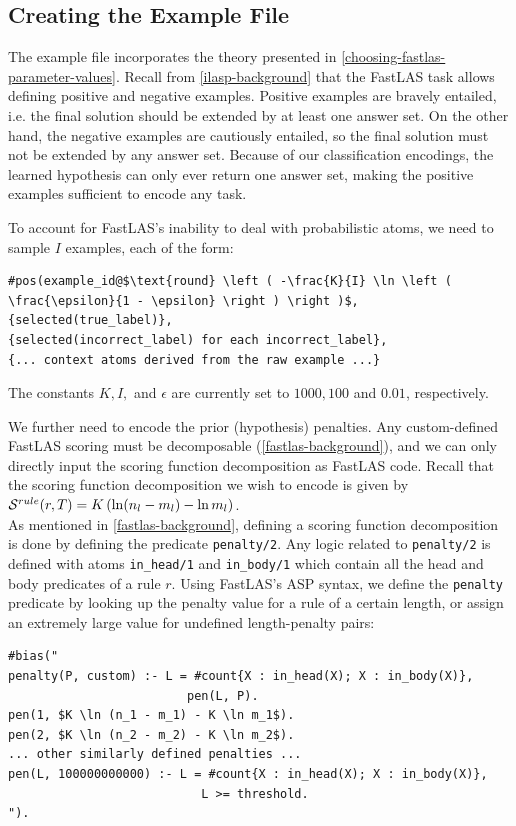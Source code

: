 \subsection{Creating the Example File}

The example file incorporates the theory presented in \ref{choosing-fastlas-parameter-values}.
Recall from \ref{ilasp-background} that the FastLAS task allows defining positive and negative examples.
Positive examples are bravely entailed, i.e. the final solution should be extended by at least one answer set.
On the other hand, the negative examples are cautiously entailed, so the final solution must not be extended by any answer set.
Because of our classification encodings, the learned hypothesis can only ever return one answer set, making the positive examples sufficient to encode any task.

To account for FastLAS's inability to deal with probabilistic atoms, we need to sample $I$ examples, each of the form:
\begin{lstlisting}
#pos(example_id@$\text{round} \left ( -\frac{K}{I} \ln \left ( \frac{\epsilon}{1 - \epsilon} \right ) \right )$,
{selected(true_label)},
{selected(incorrect_label) for each incorrect_label}, 
{... context atoms derived from the raw example ...}
\end{lstlisting}

The constants $K, I,$ and $\epsilon$ are currently set to $1000, 100$ and $0.01$, respectively.

We further need to encode the prior (hypothesis) penalties.
Any custom-defined FastLAS scoring must be decomposable (\ref{fastlas-background}), and we can only directly input the scoring function decomposition as FastLAS code.
Recall that the scoring function decomposition we wish to encode is given by $\mathcal{S}^{rule}(r, T) = K \left (\ln (n_l - m_l) - \ln m_l  \right)$.  \\
As mentioned in \ref{fastlas-background}, defining a scoring function decomposition is done by defining the predicate \verb_penalty/2_. Any logic related to \verb_penalty/2_ is defined with atoms \verb+in_head/1+ and \verb+in_body/1+ which contain all the head and body predicates of a rule $r$.
Using FastLAS's ASP syntax, we define the \verb_penalty_ predicate by looking up the penalty value for a rule of a certain length, or assign an extremely large value for undefined length-penalty pairs:
\begin{lstlisting}
#bias("
penalty(P, custom) :- L = #count{X : in_head(X); X : in_body(X)}, 
                         pen(L, P).
pen(1, $K \ln (n_1 - m_1) - K \ln m_1$).
pen(2, $K \ln (n_2 - m_2) - K \ln m_2$).
... other similarly defined penalties ...
pen(L, 100000000000) :- L = #count{X : in_head(X); X : in_body(X)}, 
                           L >= threshold.
").
\end{lstlisting}

